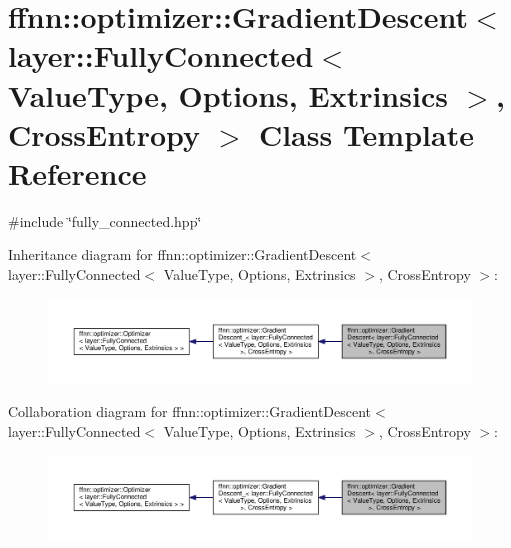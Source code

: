 \hypertarget{classffnn_1_1optimizer_1_1_gradient_descent_3_01layer_1_1_fully_connected_3_01_value_type_00_01_5467194c2be34d4b726502ad96dff6d3}{\section{ffnn\-:\-:optimizer\-:\-:Gradient\-Descent$<$ layer\-:\-:Fully\-Connected$<$ Value\-Type, Options, Extrinsics $>$, Cross\-Entropy $>$ Class Template Reference}
\label{classffnn_1_1optimizer_1_1_gradient_descent_3_01layer_1_1_fully_connected_3_01_value_type_00_01_5467194c2be34d4b726502ad96dff6d3}
}


{\ttfamily \#include \char`\"{}fully\-\_\-connected.\-hpp\char`\"{}}



Inheritance diagram for ffnn\-:\-:optimizer\-:\-:Gradient\-Descent$<$ layer\-:\-:Fully\-Connected$<$ Value\-Type, Options, Extrinsics $>$, Cross\-Entropy $>$\-:
\nopagebreak
\begin{figure}[H]
\begin{center}
\leavevmode
\includegraphics[width=350pt]{classffnn_1_1optimizer_1_1_gradient_descent_3_01layer_1_1_fully_connected_3_01_value_type_00_01_084f6752cf9233b45e4facf7aef257b0}
\end{center}
\end{figure}


Collaboration diagram for ffnn\-:\-:optimizer\-:\-:Gradient\-Descent$<$ layer\-:\-:Fully\-Connected$<$ Value\-Type, Options, Extrinsics $>$, Cross\-Entropy $>$\-:
\nopagebreak
\begin{figure}[H]
\begin{center}
\leavevmode
\includegraphics[width=350pt]{classffnn_1_1optimizer_1_1_gradient_descent_3_01layer_1_1_fully_connected_3_01_value_type_00_01_d6aece5c2fc150b20434e8d11abd53f6}
\end{center}
\end{figure}
